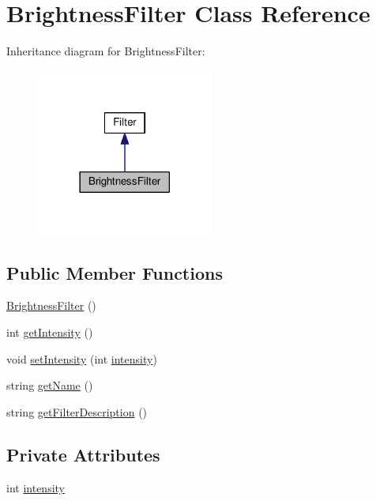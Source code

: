 \hypertarget{classModel_1_1BrightnessFilter}{}\section{Brightness\+Filter Class Reference}
\label{classModel_1_1BrightnessFilter}


Inheritance diagram for Brightness\+Filter\+:
\nopagebreak
\begin{figure}[H]
\begin{center}
\leavevmode
\includegraphics[width=165pt]{classModel_1_1BrightnessFilter__inherit__graph}
\end{center}
\end{figure}
\subsection*{Public Member Functions}
\begin{DoxyCompactItemize}
\item 
\hyperlink{classModel_1_1BrightnessFilter_a7be0e74d76ab6670dc2648d6833b9021}{Brightness\+Filter} ()
\item 
int \hyperlink{classModel_1_1BrightnessFilter_a708995fb1b6acb31ee0dfb0f4881e5b5}{get\+Intensity} ()
\item 
void \hyperlink{classModel_1_1BrightnessFilter_ac8255ffbc46bb61acaa8fd23d0d260eb}{set\+Intensity} (int \hyperlink{classModel_1_1BrightnessFilter_a299ec0c42ccc5a2d79d1739428ac3210}{intensity})
\item 
string \hyperlink{classModel_1_1BrightnessFilter_a11335e13e50af74108bf926dc1340b4b}{get\+Name} ()
\item 
string \hyperlink{classModel_1_1BrightnessFilter_a62b7b60e24f92234393b840b35808e06}{get\+Filter\+Description} ()
\end{DoxyCompactItemize}
\subsection*{Private Attributes}
\begin{DoxyCompactItemize}
\item 
int \hyperlink{classModel_1_1BrightnessFilter_a299ec0c42ccc5a2d79d1739428ac3210}{intensity}
\end{DoxyCompactItemize}
